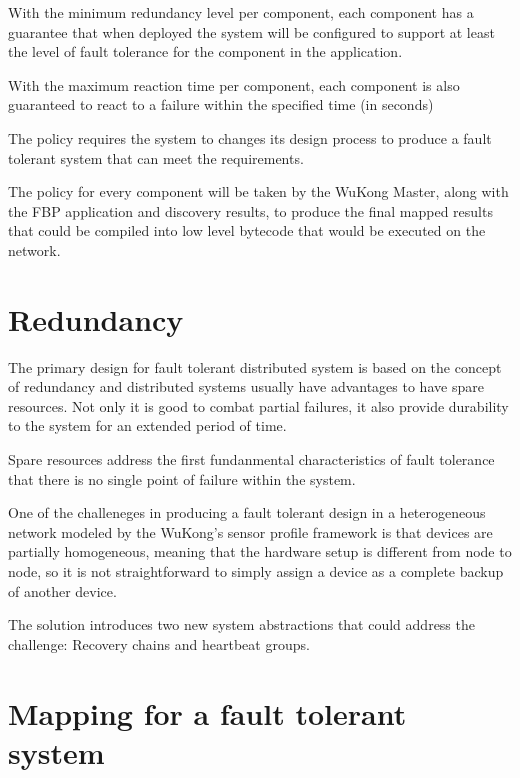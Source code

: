 With the minimum redundancy level per component, each component has
a guarantee that when deployed the system will be configured to support at
least the level of fault tolerance for the component in the application.

With the maximum reaction time per component, each component is also guaranteed
to react to a failure within the specified time (in seconds)

The policy requires the system to changes its design process to produce a fault
tolerant system that can meet the requirements.

The policy for every component will be taken by the WuKong Master, along with
the FBP application and discovery results, to produce the final mapped results
that could be compiled into low level bytecode that would be executed on the
network.

\section{Redundancy}

The primary design for fault tolerant distributed system is based on the
concept of redundancy and distributed systems usually have advantages to have
spare resources. Not only it is good to combat partial failures, it also
provide durability to the system for an extended period of time.

Spare resources address the first fundanmental characteristics of fault
tolerance that there is no single point of failure within the system.

One of the challeneges in producing a fault tolerant design in a heterogeneous
network modeled by the WuKong's sensor profile framework is that devices are
partially homogeneous, meaning that the hardware setup is different from node
to node, so it is not straightforward to simply assign a device as a complete
backup of another device.

The solution introduces two new system abstractions that could address the
challenge: Recovery chains and heartbeat groups.

\section{Mapping for a fault tolerant system}

